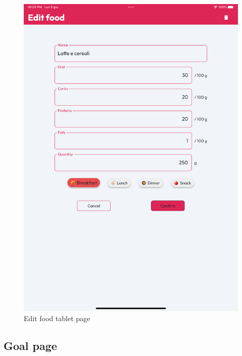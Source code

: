 \documentclass{Configuration_Files/PoliMi3i_thesis}
\begin{document}
\begin{figure}[!h]
  \includegraphics[scale=0.1]{Images/Screenshots/Tablet/EditFoodTabletLight.png}
  \caption{Edit food tablet page}
\end{figure}

\clearpage

\subsection{Goal page}
\end{document}
